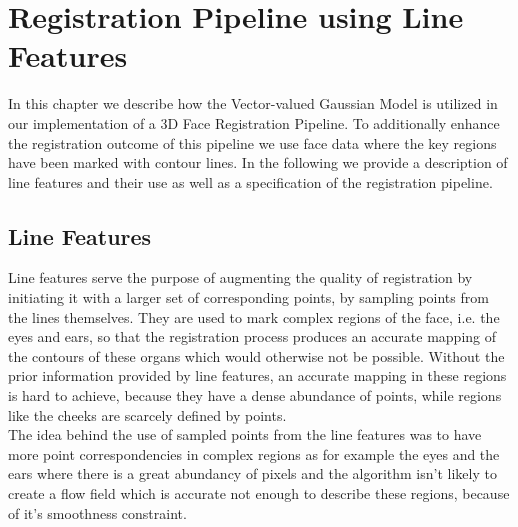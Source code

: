 \chapter{Registration Pipeline using Line Features}
In this chapter we describe how the Vector-valued Gaussian Model is utilized in our implementation of a 3D Face Registration Pipeline. To additionally enhance the registration outcome of this pipeline we use face data where the key regions have been marked with contour lines. In the following we provide a description of line features and their use as well as a specification of the registration pipeline. 

\section{Line Features}
Line features serve the purpose of augmenting the quality of registration by initiating it with a larger set of corresponding points, by sampling points from the lines themselves. They are used to mark complex regions of the face, i.e. the eyes and ears, so that the registration process produces an accurate mapping of the contours of these organs which would otherwise not be possible. Without the prior information provided by line features, an accurate mapping in these
regions is hard to achieve, because they have a dense abundance of points, while regions like the cheeks are scarcely defined by points.\\
The idea behind the use of sampled points from the line features was to have more point correspondencies in complex regions as for example the eyes and the ears where there is a great abundancy of pixels and the algorithm isn’t likely to create a flow field which is accurate not enough to describe these regions, because of it’s smoothness constraint.

